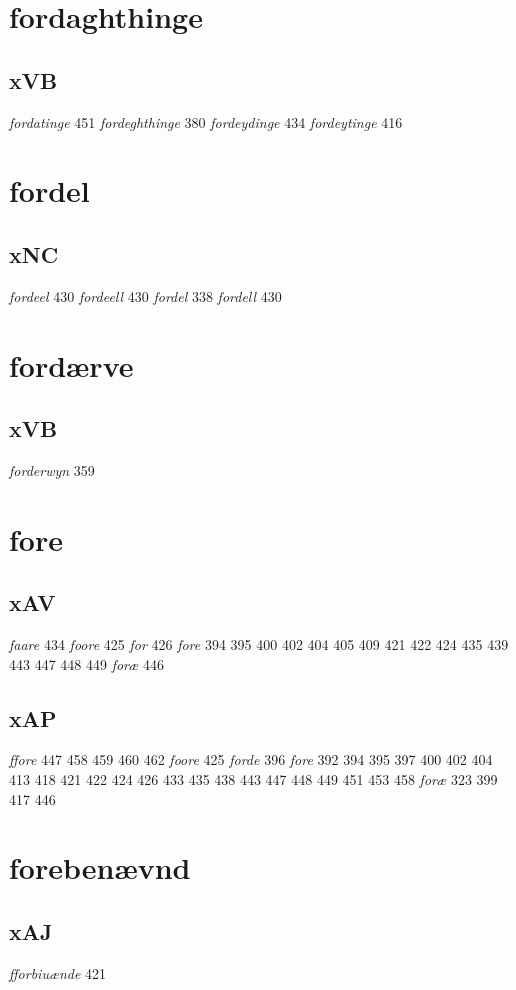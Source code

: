 \documentclass[a4paper,twocolumn]{article}
\begin{document}
\section{fordaghthinge}
\label{sec:org5f54ff7}
\subsection{xVB}
\label{sec:orgac54b66}
\emph{fordatinge} 451 \emph{fordeghthinge} 380 \emph{fordeydinge} 434 \emph{fordeytinge} 416 
\section{fordel}
\label{sec:org9d749b0}
\subsection{xNC}
\label{sec:orgbca446d}
\emph{fordeel} 430 \emph{fordeell} 430 \emph{fordel} 338 \emph{fordell} 430 
\section{fordærve}
\label{sec:org3a43aab}
\subsection{xVB}
\label{sec:orgef455e0}
\emph{forderwyn} 359 
\section{fore}
\label{sec:orgf42e4ff}
\subsection{xAV}
\label{sec:org6ef15d0}
\emph{faare} 434 \emph{foore} 425 \emph{for} 426 \emph{fore} 394 395 400 402 404 405 409 421 422 424 435 439 443 447 448 449 \emph{foræ} 446 
\subsection{xAP}
\label{sec:org6b74745}
\emph{ffore} 447 458 459 460 462 \emph{foore} 425 \emph{forde} 396 \emph{fore} 392 394 395 397 400 402 404 413 418 421 422 424 426 433 435 438 443 447 448 449 451 453 458 \emph{foræ} 323 399 417 446 
\section{forebenævnd}
\label{sec:org7042ac0}
\subsection{xAJ}
\label{sec:org0a2a923}
\emph{fforbiuænde} 421 
\end{document}
